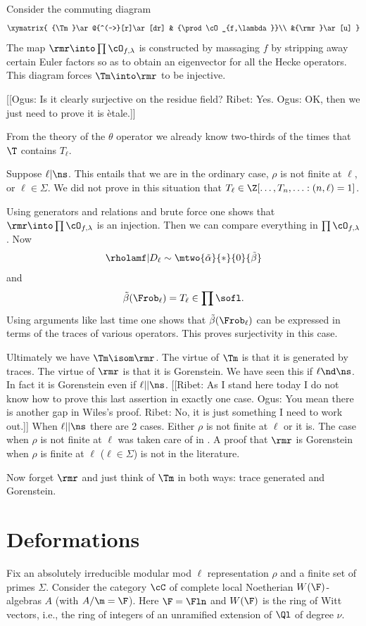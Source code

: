 \documentclass{report}
\begin{document}
Consider the commuting diagram
$$\xymatrix{
{\Tm}\ar@{^(->}[r]\ar[dr] & {\prod\cO_{f,\lambda}}\\
    &{\rmr}\ar[u]
}$$
The map $\rmr\into\prod\cO_{f,\lambda}$ is constructed by massaging
$f$ by stripping away certain Euler factors so as
to obtain an eigenvector for all the Hecke operators. This diagram
forces $\Tm\into\rmr$ to be injective.

[[Ogus: Is it clearly surjective on the residue field?
  Ribet: Yes.
  Ogus: OK, then we just need to prove it is \`{e}tale.]]

From the theory of the $\theta$ operator we already know two-thirds
of the times that $\T$ contains $T_{\ell}$.

Suppose $\ell|\ns$. This entails that we are in the ordinary case,
$\rho$ is not finite at $\ell$, or $\ell\in\Sigma$.
We did not prove in this situation that
$T_{\ell}\in\Z[\ldots, T_n,\ldots : (n,\ell)=1]$.

Using generators and relations and brute force one shows that
$\rmr\into\prod\cO_{f,\lambda}$ is an injection.
Then we can compare everything in $\prod \cO_{f,\lambda}$.
Now
$$\rholamf|D_{\ell}\sim\mtwo{\tilde{\alpha}}{*}{0}{\tilde{\beta}}$$
and $$\tilde{\beta}(\Frob_{\ell})=T_{\ell}\in\prod\sofl.$$
Using arguments like last time one shows that $\tilde{\beta}(\Frob_{\ell})$
can be expressed in terms of the traces of various operators. This
proves surjectivity in this case.

Ultimately we have $\Tm\isom\rmr$.
The virtue of $\Tm$ is that it is generated by traces. The virtue
of $\rmr$ is that it is Gorenstein. We have seen this if $\ell\nd\ns$.
In fact it is Gorenstein even if $\ell||\ns$.
[[Ribet: As I stand here today
I do not know how to prove this last assertion in exactly one case.
Ogus: You mean there is another gap in Wiles's proof.
Ribet: No, it is just something I need to work out.]]
When $\ell||\ns$ there are 2 cases. Either $\rho$ is not finite at
$\ell$ or it is. The case when $\rho$ is not finite at $\ell$
was taken care of in \cite{mazur-ribet}.
A proof that $\rmr$ is Gorenstein when $\rho$ is finite at
$\ell$ ($\ell\in\Sigma$) is not in the literature.

Now forget $\rmr$ and just think of $\Tm$ in both ways: trace
generated and Gorenstein.

\section{Deformations}
Fix an absolutely irreducible modular mod $\ell$ representation $\rho$
and a finite set of primes $\Sigma$.
Consider the category $\cC$ of complete local Noetherian
$W(\F)$-algebras $A$ (with $A/\m=\F$).
Here $\F=\Fln$ and $W(\F)$ is the ring of Witt
vectors, i.e., the ring of integers of an unramified extension of
$\Ql$ of degree $\nu$.
\end{document}
